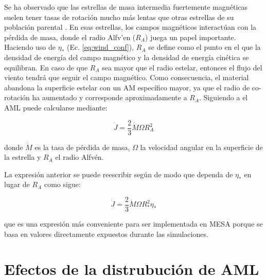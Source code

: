 Se ha observado que las estrellas de masa intermedia fuertemente magnéticas suelen tener tasas de rotación mucho más lentas que otras estrellas de su población parental \cite{Mathys2006}. En esas estrellas, los campos magnéticos interactúan con la pérdida de masa, donde el radio Alfv'{e}n ($R_{A}$) juega un papel importante. Haciendo uso de $\eta_*$ (Ec. \ref{eq:wind_conf}), $R_{A}$ se define como el punto en el que la densidad de energía del campo magnético y la densidad de energía cinética se equilibran. En caso de que $R_{A}$ sea mayor que el radio estelar, entonces el flujo del viento tendrá que seguir el campo magnético. Como consecuencia, el material abandona la superficie estelar con un AM específico mayor, ya que el radio de co-rotación ha aumentado y corresponde aproximadamente a $R_{A}$. Siguiendo a \cite{Weber1967} el AML puede calcularse mediante:

\begin{ceqn}
\begin{equation}
 \Dot{J} = \frac{2}{3} \Dot{M}\Omega R^{2}_{A} \label{eq:j_dot}
\end{equation}
\end{ceqn}

donde $\Dot{M}$ es la tasa de pérdida de masa, $\Omega$ la velocidad angular en la superficie de la estrella y $R_A$ el radio Alfv\'{e}n. \par

La expresión anterior se puede reescribir según \cite{Ud-Doula2008} de modo que dependa de $\eta_*$ en lugar de $R_A$ como sigue:

\begin{ceqn}
\begin{equation}
 \Dot{J} = \frac{2}{3} \Dot{M}\Omega R^{2}_{*}\eta_* \label{eq:j_dot_mesa}
\end{equation}

\end{ceqn}
que es una expresión más conveniente para ser implementada en MESA porque se basa en valores directamente expuestos durante las simulaciones.




\section{Efectos de la distrubución de AML}

